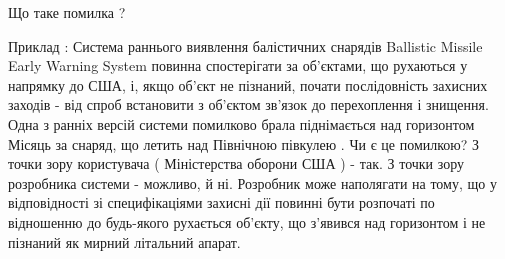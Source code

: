 Що таке помилка ?

Приклад : Система раннього виявлення балістичних снарядів Ballistic Missile Early Warning System повинна спостерігати за об'єктами, що рухаються у напрямку до США, і, якщо об'єкт не пізнаний, почати послідовність захисних заходів - від спроб встановити з об'єктом зв'язок до перехоплення і знищення. Одна з ранніх версій системи помилково брала піднімається над горизонтом Місяць за снаряд, що летить над Північною півкулею . Чи є це помилкою? З точки зору користувача ( Міністерства оборони США ) - так. З точки зору розробника системи - можливо, й ні. Розробник може наполягати на тому, що у відповідності зі специфікаціями захисні дії повинні бути розпочаті по відношенню до будь-якого рухається об'єкту, що з'явився над горизонтом і не пізнаний як мирний літальний апарат.

